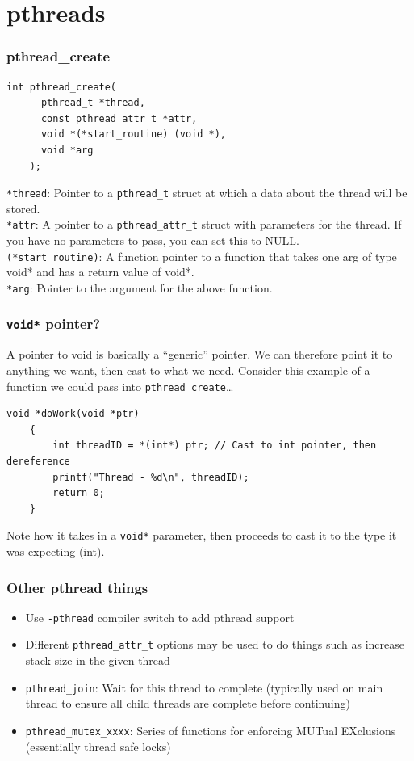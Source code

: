 \documentclass{beamer}
\begin{document}
\section{pthreads}
\begin{frame}[fragile]
  \frametitle{pthread\_create}
  \begin{lstlisting}[style=customc]
    int pthread_create(
      pthread_t *thread, 
      const pthread_attr_t *attr, 
      void *(*start_routine) (void *), 
      void *arg
    );
  \end{lstlisting}
  \texttt{*thread}: Pointer to a \texttt{pthread\_t} struct at which a data about the thread will be stored.\\
  \pause
  \texttt{*attr}: A pointer to a \texttt{pthread\_attr\_t} struct with parameters for the thread. If you have no parameters to pass, you can set this to NULL.\\
  \pause
  \texttt{(*start\_routine)}: A function pointer to a function that takes one arg of type void* and has a return value of void*.\\
  \pause
  \texttt{*arg}: Pointer to the argument for the above function.
\end{frame}
\begin{frame}[fragile]
  \frametitle{\texttt{void*} pointer?}
  A pointer to void is basically a ``generic'' pointer. We can therefore point it to anything we want, then cast to what we need. Consider this example of a function we could pass into \texttt{pthread\_create}\dots
  \begin{lstlisting}[style=customc]
    void *doWork(void *ptr)
    {
        int threadID = *(int*) ptr; // Cast to int pointer, then dereference
        printf("Thread - %d\n", threadID);
        return 0;
    }
  \end{lstlisting}
  Note how it takes in a \texttt{void*} parameter, then proceeds to cast it to the type it was expecting (int).
\end{frame}
\begin{frame}
  \frametitle{Other pthread things}
  \begin{itemize}
    \item Use \texttt{-pthread} compiler switch to add pthread support
    \item Different \texttt{pthread\_attr\_t} options may be used to do things such as increase stack size in the given thread
    \item \texttt{pthread\_join}: Wait for this thread to complete (typically used on main thread to ensure all child threads are complete before continuing)
    \item \texttt{pthread\_mutex\_xxxx}: Series of functions for enforcing MUTual EXclusions (essentially thread safe locks)
  \end{itemize}
\end{frame}
\end{document}
